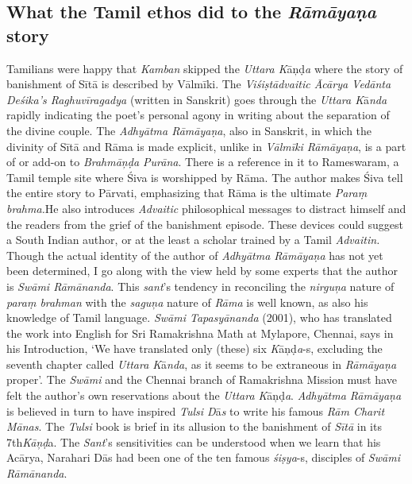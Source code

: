 \subsection{What the Tamil ethos did to the \textit{Rāmāyaṇa} story}

\item Tamilians were happy that \textit{Kamban} skipped the \textit{Uttara K}āņḍ\textit{a} where the story of banishment of Sītā is described by Vālmīki. The \textit{Viśiṣtādvaitic Ācārya Vedānta Deśika’s Raghuvīragadya} (written in Sanskrit) goes through the \textit{Uttara K}ā\textit{nda} rapidly indicating the poet’s personal agony in writing about the separation of the divine couple. The \textit{Adhyātma Rāmāyaṇa}, also in Sanskrit, in which the divinity of Sītā and Rāma is made explicit, unlike in \textit{Vālmīki Rāmāyaṇa}, is a part of or add-on to\textit{ Brahmāņḍa Purāna}. There is a reference in it to Rameswaram, a Tamil temple site where Śiva is worshipped by Rāma. The author makes Śiva tell the entire story to Pārvati, emphasizing that Rāma is the ultimate \textit{Paraṃ brahma.}He also introduces \textit{Advaitic} philosophical messages to distract himself and the readers from the grief of the banishment episode. These devices could suggest a South Indian author, or at the least a scholar trained by a Tamil \textit{Advaitin.} Though the actual identity of the author of \textit{Adhyātma Rāmāyaṇa} has not yet been determined, I go along with the view held by some experts that the author is \textit{Swāmi Rāmānanda}. This \textit{sant}’s tendency in reconciling the \textit{nirguņa} nature of \textit{paraṃ brahman} with the \textit{saguņa} nature of \textit{Rāma} is well known, as also his knowledge of Tamil language. \textit{Swāmi Tapasyānanda} (2001), who has translated the work into English for Sri Ramakrishna Math at Mylapore, Chennai, says in his Introduction, ‘We have translated only (these) six \textit{K}āņḍ\textit{a}-s, excluding the seventh chapter called \textit{Uttara K}ā\textit{nda}, as it seems to be extraneous in \textit{Rāmāyaṇa} proper’. The \textit{Swāmi} and the Chennai branch of Ramakrishna Mission must have felt the author’s own reservations about the \textit{Uttara K}āņḍ\textit{a}. \textit{Adhyātma Rāmāyaṇa} is believed in turn to have inspired \textit{Tulsi D}ā\textit{s} to write his famous \textit{Rām Charit Mānas}. The \textit{Tulsi} book is brief in its allusion to the banishment of \textit{Sītā} in its 7th\textit{Kāņḍ}a. The \textit{Sant}’s sensitivities can be understood when we learn that his Acārya, Narahari Dās had been one of the ten famous \textit{śiṣya}-s, disciples of \textit{Swāmi Rāmānanda}.



